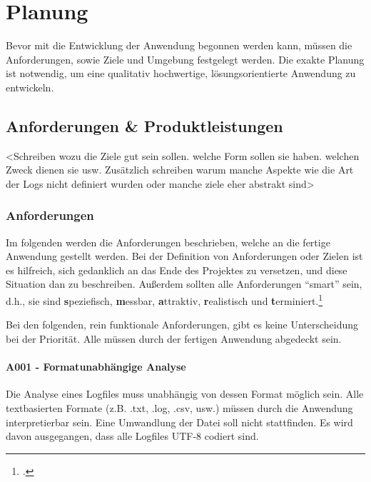 
\chapter{Planung}\label{cha:Planung}
Bevor mit die Entwicklung der Anwendung begonnen werden kann, müssen die Anforderungen, sowie Ziele und Umgebung festgelegt werden. Die exakte Planung ist notwendig, um eine qualitativ hochwertige, lösungsorientierte Anwendung zu entwickeln.


\section{Anforderungen \& Produktleistungen}\label{sec:AnforderungenUndPLs}
<Schreiben wozu die Ziele gut sein sollen. welche Form sollen sie haben. welchen Zweck dienen sie usw. Zusätzlich schreiben warum manche Aspekte wie die Art der Logs nicht definiert wurden oder manche ziele eher abstrakt sind>

\subsection{Anforderungen}
Im folgenden werden die Anforderungen beschrieben, welche an die fertige Anwendung gestellt werden. Bei der Definition von Anforderungen oder Zielen ist es hilfreich, sich gedanklich an das Ende des Projektes zu versetzen, und diese Situation dan zu beschreiben. Außerdem sollten alle Anforderungen "`smart"' sein, d.h., sie sind \textbf{s}peziefisch, \textbf{m}essbar, \textbf{a}ttraktiv, \textbf{r}ealistisch und \textbf{t}erminiert.\footcite[Vgl.][S. 48]{Bauer.2014}

Bei den folgenden, rein funktionale Anforderungen, gibt es keine Unterscheidung bei der Priorität. Alle müssen durch der fertigen Anwendung abgedeckt sein.

\subsubsection{A001 - Formatunabhängige Analyse}\label{subsubsec:A001}
Die Analyse eines Logfiles muss unabhängig von dessen Format möglich sein. Alle textbasierten Formate (z.B. .txt, .log, .csv, usw.) müssen durch die Anwendung interpretierbar sein. Eine Umwandlung der Datei soll nicht stattfinden. Es wird davon ausgegangen, dass alle Logfiles UTF-8 codiert sind.

